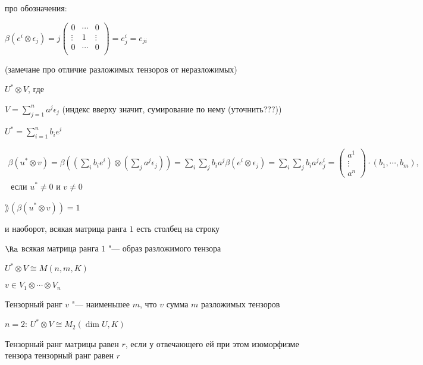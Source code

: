 \begin{Rem} про обозначения:

    $\beta(e^i \otimes \epsilon_j) = j \begin{pmatrix}
        0 & \cdots & 0 \\
        \vdots & 1 & \vdots \\
        0 & \cdots & 0 \\
        \end{pmatrix} = e_j^i = e_{ji}$
\end{Rem}

\begin{Rem}
    (замечане про отличие разложимых тензоров от неразложимых)

    $U^* \otimes V$, где 

    $V = \sum^n_{j=1} a^j \epsilon_j$ (индекс вверху значит, сумирование по нему (уточнить???))

    $U^* = \sum^n_{i=1}b_ie^i$

	\begin{gather*}\beta(u^*\otimes v) = 
            \beta((\sum_i b_i e^i)\otimes(\sum_j a^j \epsilon_j)) = 
            \sum_i\sum_j b_i a^j \beta(e^i\otimes\epsilon_j) =
            \sum_i\sum_j b_i a^j e_j^i = 
            \begin{pmatrix}
            a^1 \\
            \vdots \\
            a^n
			\end{pmatrix} \cdot (b_1, \cdots, b_m),\\ \text{ если $u^* \neq 0$ и $v \neq 0$}
	\end{gather*}

    $\rang(\beta(u^* \otimes v)) = 1$

    и наоборот, всякая матрица ранга $1$ есть столбец на строку

    $\Ra$ всякая матрица ранга $1$ "--- образ разложимого тензора

    $U^* \otimes V \cong M(n,m, K)$
\end{Rem}

\begin{Def}
    $v \in V_1 \otimes \cdots \otimes V_n$

    Тензорный ранг $v$ "--- наименьшее $m$, что $v$ сумма $m$ разложимых тензоров
\end{Def}

$n = 2$: $U^* \otimes V \cong M_2(\dim U, K)$

Тензорный ранг матрицы равен $r$, если у отвечающего ей при этом изоморфизме тензора тензорный ранг равен $r$

